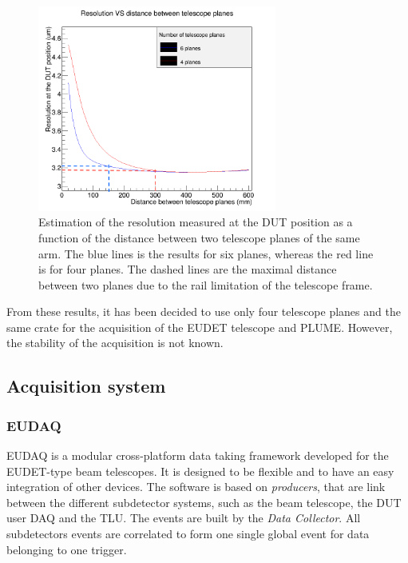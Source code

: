     \begin{figure}[!h]
      \centering
      \includegraphics[width = 0.7\textwidth]{Pictures/X0/resolution_4Vs6planes_4-7GeV.png}
      \caption{Estimation of the resolution measured at the DUT position as a function of the distance between two telescope planes of the same arm.
      The blue lines is the results for six planes, whereas the red line is for four planes. 
      The dashed lines are the maximal distance between two planes due to the rail limitation of the telescope frame.}
      \label{fig:estimationRes4.7GeV}
    \end{figure}

    From these results, it has been decided to use only four telescope planes and the same crate for the acquisition of the EUDET telescope and PLUME.
    However, the stability of the acquisition is not known.

    \subsection{Acquisition system}
      
      \subsubsection{EUDAQ}

      EUDAQ is a modular cross-platform data taking framework developed for the EUDET-type beam telescopes\cite{Jansen}.
      It is designed to be flexible and to have an easy integration of other devices.
      The software is based on \textit{producers}, that are link between the different subdetector systems, such as the beam telescope, the \gls{DUT} user DAQ and the \gls{TLU}.
      The events are built by the \textit{Data Collector}.
      All subdetectors events are correlated to form one single global event for data belonging to one trigger.
      
